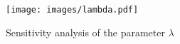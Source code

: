 \begin{figure}[!ht]
\centering
\texttt{[image: images/lambda.pdf]}
\caption{\small Sensitivity analysis of the parameter $\lambda$}
\label{fig:lambda}
\end{figure}